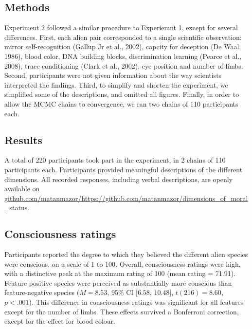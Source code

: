 \documentclass[10pt, letterpaper]{article}
\begin{document}
\hypertarget{methods-1}{%
\subsection{Methods}\label{methods-1}}

Experiment 2 followed a similar procedure to Experiemnt 1, except for
several differences. First, each alien pair corresponded to a single
scientific observation: mirror self-recognition (Gallup Jr et al.,
2002), capcity for deception (De Waal, 1986), blood color, DNA building
blocks, discrimination learning (Pearce et al., 2008), trace
conditioning (Clark et al., 2002), eye position and number of limbs.
Second, participants were not given information about the way scientists
interpreted the findings. Third, to simplify and shorten the experiment,
we simplified some of the descriptions, and omitted all figures.
Finally, in order to allow the MCMC chains to convergence, we ran two
chains of 110 participants each.

\hypertarget{results-1}{%
\subsection{Results}\label{results-1}}

A total of 220 participants took part in the experiment, in 2 chains of
110 participants each. Participants provided meaningful descriptions of
the different dimensions. All recorded responses, including verbal
descriptions, are openly available on
\url{github.com/matanmazor/https://github.com/matanmazor/dimensions_of_moral_status}.

\hypertarget{consciousness-ratings-1}{%
\subsection{Consciousness ratings}\label{consciousness-ratings-1}}

Participants reported the degree to which they believed the different
alien species were conscious, on a scale of 1 to 100. Overall,
consciousness ratings were high, with a distinctive peak at the maximum
rating of 100 (mean rating = 71.91). Feature-positive species were
perceived as substantially more conscious than feature-negative species
(\(M = 8.53\), 95\% CI \([6.58\), \(10.48]\), \(t(216) = 8.60\),
\(p < .001\)). This difference in consciousness ratings was significant
for all features except for the number of limbs. These effects survived
a Bonferroni correction, except for the effect for blood colour.
\end{document}
